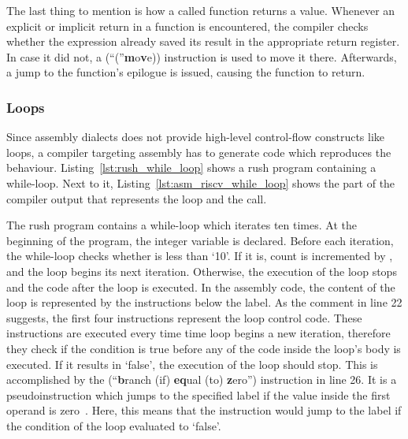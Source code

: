 The last thing to mention is how a called function returns a value.
Whenever an explicit or implicit return in a function is encountered,
the compiler checks whether the expression already saved its result in the appropriate return register.
In case it did not, a  (\enquote(\textbf{m}o\textbf{v}e)) instruction is used to move it there.
Afterwards, a jump to the function's epilogue is issued, causing the function to return.

\subsubsection{Loops}

Since assembly dialects does not provide high-level control-flow constructs like loops,
a compiler targeting assembly has to generate code which reproduces the behaviour.
Listing~\ref{lst:rush_while_loop} shows a rush program containing a while-loop.
Next to it, Listing~\ref{lst:asm_riscv_while_loop} shows the part of the compiler output that represents the loop and the  call.

\noindent
\begin{minipage}{.45\textwidth}
	\centering
\end{minipage}%
\hfill
\begin{minipage}{.45\textwidth}
	\centering
	\vspace{.1cm}
\end{minipage}

The rush program contains a while-loop which iterates ten times.
At the beginning of the program, the integer variable  is declared.
Before each iteration, the while-loop checks whether  is less than `10'.
If it is, count is incremented by , and the loop begins its next iteration.
Otherwise, the execution of the loop stops and the code after the loop is executed.
In the assembly code, the content of the loop is represented by the instructions below the  label.
As the comment in line 22 suggests, the first four instructions represent the loop control code.
These instructions are executed every time time loop begins a new iteration, therefore they check if the condition is true before any of the code inside the loop's body is executed.
If it results in `false', the execution of the loop should stop.
This is accomplished by the  (\enquote{\textbf{b}ranch (if) \textbf{eq}ual (to) \textbf{z}ero}) instruction in line 26.
It is a pseudoinstruction which jumps to the specified label if the value inside the first operand is zero~\cite[p.~105]{Waterman2019}.
Here, this means that the instruction would jump to the  label if the condition of the loop evaluated to `false'.

